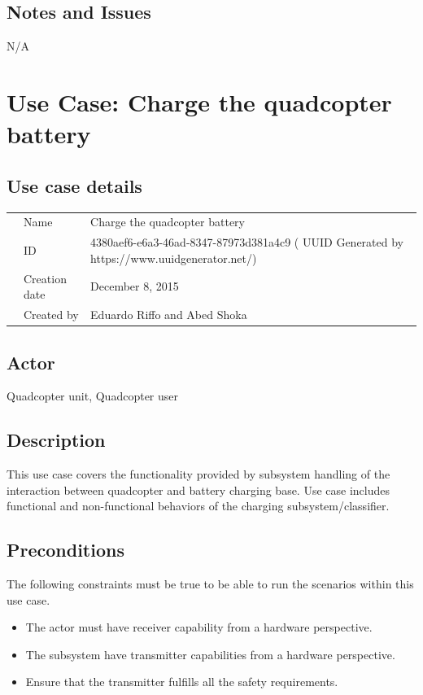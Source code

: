\documentclass[a4paper]{article}
\begin{document}
\subsection{Notes and Issues}
N/A

\section{Use Case: Charge the quadcopter battery}
\subsection{Use case details}

\begin{tabular}{lll}
	&Name  &Charge the quadcopter battery  \\
	&ID  &4380aef6-e6a3-46ad-8347-87973d381a4c9 ( UUID Generated by https://www.uuidgenerator.net/)  \\
	&Creation date  & December 8, 2015  \\
	&Created by  &Eduardo Riffo and Abed Shoka   
\end{tabular}

\subsection{Actor}
Quadcopter unit, Quadcopter user
\subsection{Description}
This use case covers the functionality provided by subsystem handling of the interaction between quadcopter and battery charging base. Use case includes functional and non-functional behaviors of the charging subsystem/classifier.

\subsection{Preconditions}
The following constraints must be true to be able to run the scenarios within this use case.
\begin{itemize}
	\item The actor must have receiver capability from a hardware perspective.
	\item The subsystem have transmitter capabilities from a hardware perspective.
	\item Ensure that the transmitter fulfills all the safety requirements.
\end{itemize}
\end{document}
